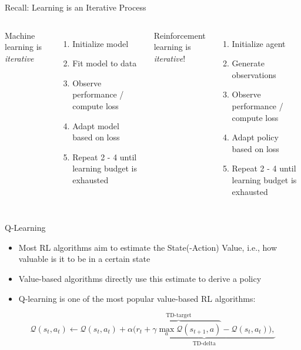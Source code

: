 \documentclass[main]{subfiles}
\begin{document}
\begin{frame}{Recall: Learning is an Iterative Process} 

    \begin{columns}
    Machine learning is \emph{iterative}
    \begin{enumerate}
        \item Initialize model
        \item Fit model to data
        \item Observe performance / compute loss
        \item Adapt model based on loss
        \item Repeat 2 - 4 until learning budget is exhausted
    \end{enumerate}\pause
    Reinforcement learning is \emph{iterative}!
    \pause
    \begin{enumerate}
        \item Initialize agent
    \pause
        \item \alert{Generate observations}
    \pause
        \item Observe performance / compute loss
    \pause
        \item Adapt policy based on loss
    \pause
        \item Repeat 2 - 4 until learning budget is exhausted
    \end{enumerate}
    \end{columns}
\end{frame}
\begin{frame}{Q-Learning}
    \begin{itemize}
        \item Most RL algorithms aim to estimate the State(-Action) Value, i.e., how valuable is it to be in a certain state\pause
        \item Value-based algorithms directly use this estimate to derive a policy\pause
        \item Q-learning  is one of the most popular value-based RL algorithms:\pause
    \end{itemize}
    \begin{equation*}
        \mathcal{Q}(s_t, a_t) \gets \mathcal{Q}(s_t, a_t) +
        \alpha
        \underbrace{
            \Big(
                \overbrace{
                    r_{t} + \gamma \max_a\mathcal{Q}(s_{t+1},a)
                }^{\text{TD-target}}
                - \mathcal{Q}(s_t,a_t)
            \Big),
        }_{\text{TD-delta}}
    \end{equation*}
\end{frame}
\end{document}
